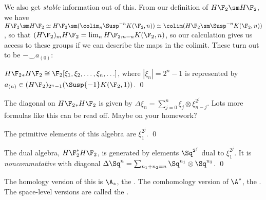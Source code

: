 We also get \emph{stable} information out of this.  From our definition of $H\F_2 \sm H\F_2$, we have $H\F_2 \sm H\F_2 \simeq H\F_2 \sm (\colim_n \Susp^{-n} K(\F_2, n)) \simeq \colim (H\F_2 \sm \Susp^{-n} K(\F_2, n))$, so that $(H\F_2)_m H\F_2 = \lim_n H\F_2{}_{m-n} K(\F_2, n)$, so our calculation gives us access to these groups if we can describe the maps in the colimit.  These turn out to be $- \smile a_{(0)}$:
\begin{center}
\end{center}

\begin{corollary}
$H\F_2{}_* H\F_2 \cong \F_2[\xi_1, \xi_2, \ldots, \xi_n, \ldots]$, where $|\xi_n| = 2^n - 1$ is represented by $a_{(n)} \in (H\F_2)_{2^n-1}(\Susp{-1} K(\F_2, 1))$. \qed
\end{corollary}
The diagonal on $H\F_2{}_* H\F_2$ is given by $\Delta \xi_n = \sum_{j=0}^n \xi_j \otimes \xi_{n-j}^{2^j}$.  Lots more formulas like this can be read off.  Maybe on your homework?

\begin{corollary}
The primitive elements of this algebra are $\xi_1^{2^j}$. \qed
\end{corollary}

\begin{corollary}
The dual algebra, $H\F_2^* H\F_2$, is generated by elements $\Sq^{2^j}$ dual to $\xi_1^{2^j}$.  It is \emph{noncommutative} with diagonal $\Delta \Sq^n = \sum_{n_1 + n_2 = n} \Sq^{n_1} \otimes \Sq^{n_2}$. \qed
\end{corollary}

The homology version of this is $\A_*$, the .  The comhomology version of $\A^*$, the .  The space-level versions are called the .

